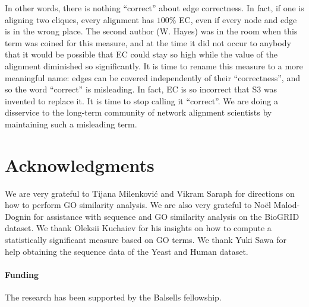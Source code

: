 \documentclass{bioinfo}
\begin{document}
In other words, there is nothing ``correct'' about edge correctness. In fact, if one is aligning two cliques, every alignment has $100\%$ EC, even if every node and edge is in the wrong place. The second author (W. Hayes) was in the room when this term was coined for this measure, and at the time it did not occur to anybody that it would be possible that EC could stay so high while the value of the alignment diminished so significantly. It is time to rename this measure to a more meaningful name: edges can be covered independently of their ``correctness'', and so the word ``correct'' is misleading. In fact, EC is so incorrect that S3 was invented to replace it. It is time to stop calling it ``correct''. We are doing a disservice to the long-term community of network alignment scientists by maintaining such a misleading term.




\section*{Acknowledgments}

We are very grateful to Tijana Milenkovi\'{c} and Vikram Saraph for directions on how to perform GO similarity analysis. We are also very grateful to No{\"e}l Malod-Dognin for assistance with sequence and GO similarity analysis on the BioGRID dataset. We thank Oleksii Kuchaiev for his insights on how to compute a statistically significant measure based on GO terms. We thank Yuki Sawa for help obtaining the sequence data of the Yeast and Human dataset.

\paragraph{Funding} The research has been supported by the Balsells fellowship.



\end{document}
